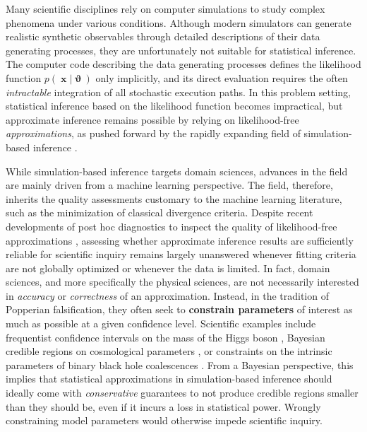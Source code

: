 \documentclass[twoside]{article}
\DeclareMathOperator{\vtheta}{\boldsymbol\vartheta}
\DeclareMathOperator{\vx}{\boldsymbol x}
\begin{document}
Many scientific disciplines rely on computer simulations to study complex phenomena under various conditions. 
Although modern simulators can generate realistic synthetic observables through detailed descriptions of their data generating processes, they are unfortunately not suitable for statistical inference.
The computer code describing the data generating processes defines the likelihood function $p(\vx\vert\vtheta)$ only implicitly, and its direct evaluation requires the often \emph{intractable} integration of all stochastic execution paths.
In this problem setting, statistical inference based on the likelihood function becomes impractical, but approximate inference remains possible by relying on likelihood-free \emph{approximations}, as pushed forward by the rapidly expanding field of simulation-based inference \citep{cranmer2020frontier}. 

While simulation-based inference targets domain sciences, advances in the field are mainly driven from a machine learning perspective.
The field, therefore, inherits the quality assessments \citep{lueckmann2021benchmarking} customary to the machine learning literature, such as the minimization of classical divergence criteria. 
Despite recent developments of post hoc diagnostics to inspect the quality of likelihood-free approximations \citep{cranmer2015approximating, Brehmer:2018eca, brehmer2019mining, Hermans:2020skz, lueckmann2021benchmarking, sbc, dalmasso2020confidence}, assessing whether approximate inference results are sufficiently reliable for scientific inquiry remains largely unanswered whenever fitting criteria are not globally optimized or whenever the data is limited.
In fact, domain sciences, and more specifically the physical sciences, are not necessarily interested in \emph{accuracy} or \emph{correctness} of an approximation. 
Instead, in the tradition of Popperian falsification, they often seek to {\bfseries constrain parameters} of interest as much as possible at a given confidence level. 
Scientific examples include frequentist confidence intervals on the mass of the Higgs boson \citep{aad2012observation}, Bayesian credible regions on cosmological parameters \citep{gilman2018probing,Planck:2018vyg}, or constraints on the intrinsic parameters of binary black hole coalescences \citep{abbott2016gw151226}.
From a Bayesian perspective, this implies that statistical approximations in simulation-based inference should ideally come with \emph{conservative} guarantees to not produce credible regions smaller than they should be, even if it incurs a loss in statistical power.
Wrongly constraining model parameters would otherwise impede scientific inquiry.
\end{document}
